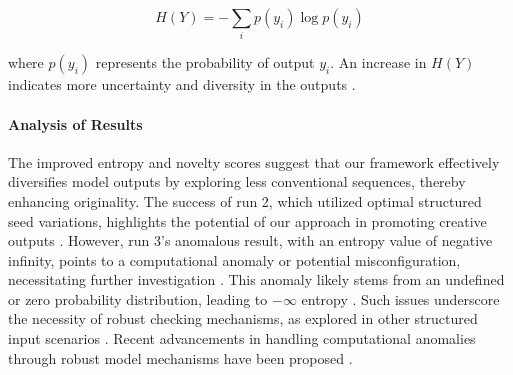 \documentclass[11pt]{article}
\begin{document}
\begin{equation}
H(Y) = - \sum_{i} p(y_i) \log p(y_i)
\end{equation}


where $p(y_i)$ represents the probability of output $y_i$. An increase in $H(Y)$ indicates more uncertainty and diversity in the outputs \cite{maximum2010}.


\begin{table}[h]
\centering
\caption{Comparison of entropy and novelty scores across different runs using structured seed-conditioning.}
\label{tab:results}
\end{table}


\paragraph{Analysis of Results} The improved entropy and novelty scores suggest that our framework effectively diversifies model outputs by exploring less conventional sequences, thereby enhancing originality. The success of run 2, which utilized optimal structured seed variations, highlights the potential of our approach in promoting creative outputs \cite{measuring2025,generative2024}. However, run 3's anomalous result, with an entropy value of negative infinity, points to a computational anomaly or potential misconfiguration, necessitating further investigation \cite{large2024}. This anomaly likely stems from an undefined or zero probability distribution, leading to $-\infty$ entropy \cite{creating2012}. Such issues underscore the necessity of robust checking mechanisms, as explored in other structured input scenarios \cite{cottontail2025}. Recent advancements in handling computational anomalies through robust model mechanisms have been proposed \cite{investigating2025}.
\end{document}
